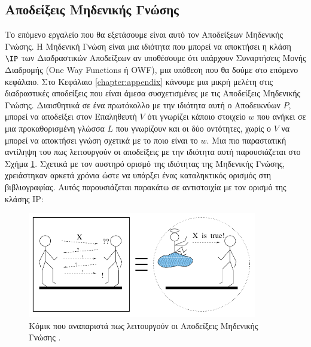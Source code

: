 \subsection{Αποδείξεις Μηδενικής Γνώσης}

Το επόμενο εργαλείο που θα εξετάσουμε είναι αυτό τον Αποδείξεων Μηδενικής Γνώσης. Η Μηδενική Γνώση είναι μια ιδιότητα που μπορεί να αποκτήσει η κλάση $\IP$ των Διαδραστικών Αποδείξεων αν υποθέσουμε ότι υπάρχουν Συναρτήσεις Μονής Διαδρομής (One Way Functions ή OWF), μια υπόθεση που θα δούμε στο επόμενο κεφάλαιο. Στο Κεφάλαιο \ref{chapter:appendix} κάνουμε μια μικρή μελέτη στις διαδραστικές αποδείξεις που είναι άμεσα συσχετισμένες με τις Αποδείξεις Μηδενικής Γνώσης. Διαισθητικά σε ένα πρωτόκολλο με την ιδιότητα αυτή ο Αποδεικνύων $P$, μπορεί να αποδείξει στον Επαληθευτή $V$ ότι γνωρίζει κάποιο στοιχείο $w$ που ανήκει σε μια προκαθορισμένη γλώσσα $L$ που γνωρίζουν και οι δύο οντότητες, χωρίς ο $V$ να μπορεί να αποκτήσει γνώση σχετικά με το ποιο είναι το $w$. Μια πιο παραστατική αντίληψη του πως λειτουργούν οι αποδείξεις με την ιδιότητα αυτή παρουσιάζεται στο Σχήμα \ref{fig:zero_knowledge_comic}. Σχετικά με τον αυστηρό ορισμό της ιδιότητας της Μηδενικής Γνώσης, χρειάστηκαν αρκετά χρόνια ώστε να υπάρξει ένας καταληκτικός ορισμός στη βιβλιογραφίας. Αυτός παρουσιάζεται παρακάτω σε αντιστοιχία με τον ορισμό της κλάσης IP:

\begin{figure}[hb]
    \centering
    \includegraphics[width=10cm]{./01_body/images/zero_knowledge_comic.png}
    \caption{Κόμικ που αναπαριστά πως λειτουργούν οι Αποδείξεις Μηδενικής Γνώσης \cite{goldreich2013short}.}
    \label{fig:zero_knowledge_comic}
\end{figure}

